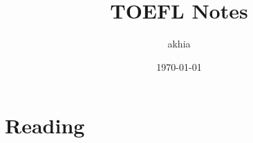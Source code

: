 \documentclass{report}
\title{TOEFL Notes}
\author{akhia}
\date{\today}
\begin{document}
\chapter{Reading}













































































\end{document}

